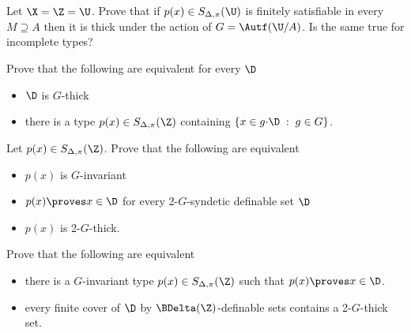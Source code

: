 

\begin{exercise}
  Let $\X=\Z=\U$.
  Prove that if $p(x)\in S_{\Delta,\pi}(\U)$ is finitely satisfiable in every $M\supseteq A$ then it is thick under the action of $G=\Autf(\U/A)$.
  Is the same true for incomplete types?
\end{exercise}

\begin{exercise}
  Prove that the following are equivalent for every $\D$
  \begin{itemize}
    \item[1.] $\D$ is $G$-thick
    \item[2.] there is a type $p(x)\in S_{\Delta,\pi}(\Z)$ containing $\{x\in g{\cdot}\D\;:\;g\in G\}$.
  \end{itemize}
\end{exercise}

\begin{exercise}
  Let $p(x)\in S_{\Delta,\pi}(\Z)$.
  Prove that the following are equivalent
  \begin{itemize}
    \item[1.] $p(x)$ is $G$-invariant
    \item[2.] $p(x)\proves x\in\D$ for every 2-$G$-syndetic definable set $\D$
    \item[3.] $p(x)$ is 2-$G$-thick.
  \end{itemize}
\end{exercise}

\begin{exercise}
  Prove that the following are equivalent 
  \begin{itemize}
    \item[1.] there is a $G$-invariant type $p(x)\in S_{\Delta,\pi}(\Z)$ such that $p(x)\proves x\in\D$.
    \item[2.] every finite cover of $\D$ by $\BDelta(\Z)$-definable sets contains a 2-$G$-thick set.
  \end{itemize}
\end{exercise}

